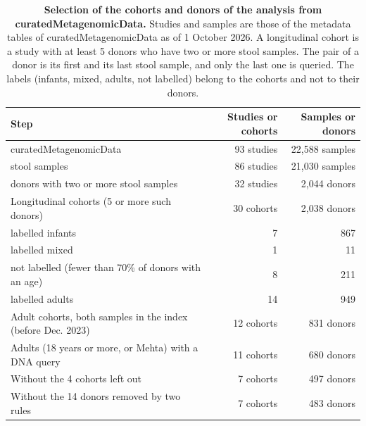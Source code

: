 \documentclass[11pt,a4paper]{article}
\begin{document}
\setcounter{table}{0}
\begin{table}[!htbp]\centering\small
\caption[Selection of the cohorts and donors of the analysis from curatedMetagenomicData]{\textbf{Selection of the cohorts and donors of the analysis from curatedMetagenomicData.} Studies and samples are those of the metadata tables of curatedMetagenomicData as of 1 October 2026. A longitudinal cohort is a study with at least 5 donors who have two or more stool samples. The pair of a donor is its first and its last stool sample, and only the last one is queried. The labels (infants, mixed, adults, not labelled) belong to the cohorts and not to their donors.}
\begin{tabular}{lrr}
\toprule
Step & Studies or cohorts & Samples or donors \\
\midrule
curatedMetagenomicData & 93 studies & 22,588 samples \\
\quad stool samples & 86 studies & 21,030 samples \\
\quad donors with two or more stool samples & 32 studies & 2,044 donors \\
\midrule
Longitudinal cohorts (5 or more such donors) & 30 cohorts & 2,038 donors \\
\quad labelled infants & 7 & 867 \\
\quad labelled mixed & 1 & 11 \\
\quad not labelled (fewer than 70\% of donors with an age) & 8 & 211 \\
\quad labelled adults & 14 & 949 \\
\midrule
Adult cohorts, both samples in the index (before Dec. 2023) & 12 cohorts & 831 donors \\
Adults (18 years or more, or Mehta) with a DNA query & 11 cohorts & 680 donors \\
Without the 4 cohorts left out & 7 cohorts & 497 donors \\
Without the 14 donors removed by two rules & 7 cohorts & 483 donors \\
\bottomrule
\end{tabular}
\end{table}
\end{document}
